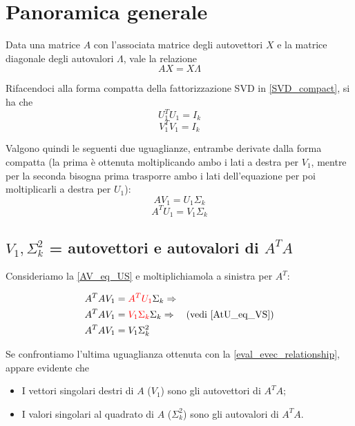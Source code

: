 \section{Panoramica generale}
Data una matrice $A$ con l'associata matrice degli autovettori $X$ e la matrice 
diagonale degli autovalori $\Lambda$, vale la relazione
\begin{equation}\label{eval_evec_relationship}
A X = X \Lambda
\end{equation}

Rifacendoci alla forma compatta della fattorizzazione SVD in 
\eqref{SVD_compact}, si ha che
\begin{equation*}
	U_{1}^T U_1 = I_k
\end{equation*}
\begin{equation*}
	V_{1}^T V_1 = I_k
\end{equation*}


Valgono quindi le seguenti due uguaglianze, entrambe derivate dalla forma 
compatta (la prima è ottenuta moltiplicando ambo i lati a destra per $V_1$, 
mentre per la seconda bisogna prima trasporre ambo i lati dell'equazione per poi 
moltiplicarli a destra per $U_1$):
\begin{equation}\label{AV_eq_US}
	A V_1 = U_1 \Sigma_k
\end{equation}
\begin{equation}\label{AtU_eq_VS}
	A^T U_1 = V_1 \Sigma_k
\end{equation}


\subsection{$V_1, \Sigma_{k}^2$ = autovettori e autovalori di $A^T A$}
Consideriamo la \eqref{AV_eq_US} e moltiplichiamola a sinistra per $A^T$:
\begin{flushleft}
\vspace{-20pt}
\begin{align*}
	A^T A V_1 &= \textcolor{red}{A^T U_1} \Sigma_k \Rightarrow \\
	A^T A V_1 &= \textcolor{red}{V_1 \Sigma_k} \Sigma_k \Rightarrow \quad 
\text{(vedi \eqref{AtU_eq_VS}}) \\
	A^T A V_1 &= V_1 \Sigma_{k}^2
\end{align*}
\end{flushleft}

Se confrontiamo l'ultima uguaglianza ottenuta con la 
\eqref{eval_evec_relationship}, appare evidente che
\begin{itemize}
	\item I vettori singolari destri di $A$ ($V_1$) sono gli autovettori di $A^T 
A$;
	\item I valori singolari al quadrato di $A$ ($\Sigma_{k}^2$) sono gli 
autovalori di $A^T A$.
\end{itemize}



